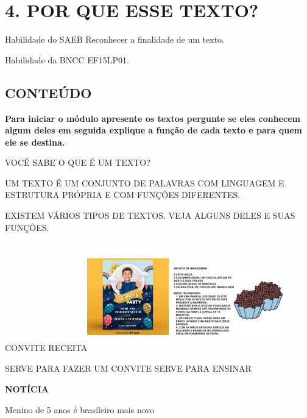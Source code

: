 \section{4. POR QUE ESSE TEXTO?
}\label{muxf3dulo-4-por-que-esse-texto}

\protect\hypertarget{_heading=h.4i7ojhp}{}{}Habilidade do SAEB
Reconhecer a finalidade de um texto.

Habilidade da BNCC
EF15LP01.

\subsection{CONTEÚDO}\label{conteuxfado-3}

\textbf{Para iniciar o módulo apresente os textos pergunte se eles
conhecem algum deles em seguida explique a função de cada texto e para
quem ele se destina.}

VOCÊ SABE O QUE É UM TEXTO?

UM TEXTO É UM CONJUNTO DE PALAVRAS COM LINGUAGEM E ESTRUTURA PRÓPRIA E
COM FUNÇÕES DIFERENTES.

EXISTEM VÁRIOS TIPOS DE TEXTOS. VEJA ALGUNS DELES E SUAS FUNÇÕES.

CONVITE
RECEITA\includegraphics[width=1.39444in,height=1.86944in]{media/image132.jpg}\includegraphics[width=2.02014in,height=1.72778in]{media/image134.png}

SERVE PARA FAZER UM CONVITE SERVE PARA ENSINAR

\textbf{NOTÍCIA}

Menino de 5 anos é brasileiro mais novo

